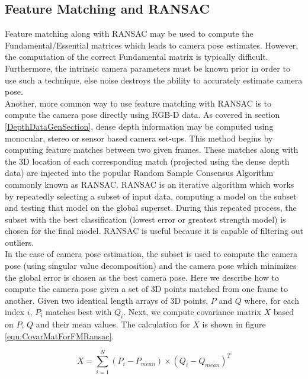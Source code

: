 \subsection{Feature Matching and RANSAC}
\label{FMANDFM}

Feature matching along with RANSAC  may be used to compute the Fundamental/Essential matrices which leads to camera pose estimates. However, the computation of the correct Fundamental matrix is typically difficult. Furthermore, the intrinsic camera parameters must be known prior in order to use such a technique, else noise destroys the ability to accurately estimate camera pose. \\

Another, more common way to use feature matching with RANSAC \cite{Fischler81Random,Chen99Ransac} is to compute the camera pose directly using RGB-D data. As covered in section \ref{DepthDataGenSection}, dense depth information may be computed using monocular, stereo or sensor based camera set-ups. This method begins by computing feature matches between two given frames. These matches along with the 3D location of each corresponding match (projected using the dense depth data) are injected into the popular Random Sample Consensus Algorithm commonly known as RANSAC. RANSAC is an iterative algorithm which works by repeatedly selecting a subset of input data, computing a model on the subset and testing that model on the global superset. During this repeated process, the subset with the best classification (lowest error or greatest strength model) is chosen for the final model. RANSAC is useful because it is capable of filtering out outliers. \\

In the case of camera pose estimation, the subset is used to compute the camera pose (using singular value decomposition) and the camera pose which minimizes the global error is chosen as the best camera pose. Here we describe how to compute the camera pose given a set of 3D points matched from one frame to another. Given two identical length arrays of 3D points, $P$ and $Q$ where, for each index $i$, $P_i$ matches best with $Q_i$. Next, we compute covariance matrix $X$ based on $P$, $Q$ and their mean values. The calculation for $X$ is shown in figure \ref{eqn:CovarMatForFMRansac}.


\begin{equation} \label{eqn:CovarMatForFMRansac}
X = \sum_{i=1}^{N} (P_i - P_{mean}) \times (Q_i - Q_{mean})^T
\end{equation}

